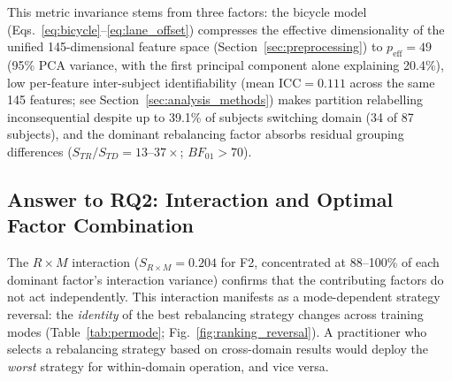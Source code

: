 \documentclass[lettersize,journal]{IEEEtran}
\begin{document}
This metric invariance stems from three factors: the bicycle model (Eqs.~\eqref{eq:bicycle}--\eqref{eq:lane_offset}) compresses the effective dimensionality of the unified 145-dimensional feature space (Section~\ref{sec:preprocessing}) to $p_{\mathrm{eff}} = 49$ (95\% PCA variance, with the first principal component alone explaining 20.4\%), low per-feature inter-subject identifiability (mean $\mathrm{ICC} = 0.111$ across the same 145 features; see Section~\ref{sec:analysis_methods}) makes partition relabelling inconsequential despite up to 39.1\% of subjects switching domain (34 of 87 subjects), and the dominant rebalancing factor absorbs residual grouping differences ($S_{TR}/S_{TD} = 13$--$37\times$; $BF_{01} > 70$).

\subsection{Answer to RQ2: Interaction and Optimal Factor Combination}\label{sec:rq2}
The $R \times M$ interaction ($S_{R \times M} = 0.204$ for F2, concentrated at 88--100\% of each dominant factor's interaction variance) confirms that the contributing factors do not act independently.
This interaction manifests as a mode-dependent strategy reversal: the \emph{identity} of the best rebalancing strategy changes across training modes (Table~\ref{tab:permode}; Fig.~\ref{fig:ranking_reversal}).
A practitioner who selects a rebalancing strategy based on cross-domain results would deploy the \emph{worst} strategy for within-domain operation, and vice versa.
\end{document}
